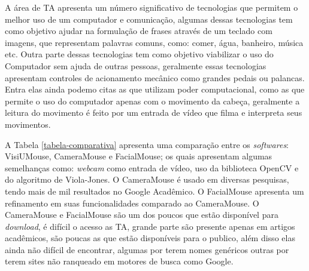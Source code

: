A área de TA apresenta um número significativo de tecnologias que permitem o melhor uso de um computador e comunicação, algumas dessas tecnologias tem como objetivo ajudar na formulação de frases através de um teclado com imagens, que representam palavras comuns, como: comer, água, banheiro, música etc. Outra parte dessas tecnologias tem como objetivo viabilizar o uso do Computador sem ajuda de outras pessoas, geralmente essas tecnologias apresentam controles de acionamento mecânico como grandes pedais ou palancas. Entra elas ainda podemo citas as que utilizam poder computacional, como as que permite o uso do computador apenas com o movimento da cabeça, geralmente a leitura do movimento é feito por um  entrada de vídeo que filma e interpreta seus movimentos.

A Tabela \ref{tabela-comparativa} apresenta uma comparação entre os \textit{softwares}: VisiUMouse, CameraMouse e FacialMouse; os quais apresentam algumas semelhanças como: \textit{webcam} como entrada de vídeo, uso da biblioteca OpenCV e do algoritmo de Viola-Jones. O CameraMouse é usado em diversas pesquisas, tendo mais de mil resultados no Google Acadêmico. O FacialMouse apresenta um refinamento em suas funcionalidades comparado ao CameraMouse. O CameraMouse e FacialMouse são um dos poucos que estão disponível para \textit{download}, é difícil o acesso as TA, grande parte são presente apenas em artigos acadêmicos, são poucas as que estão disponíveis para o publico, além disso elas ainda não difícil de encontrar, algumas por terem nomes genéricos outras por terem sites não ranqueado em motores de busca como Google.


